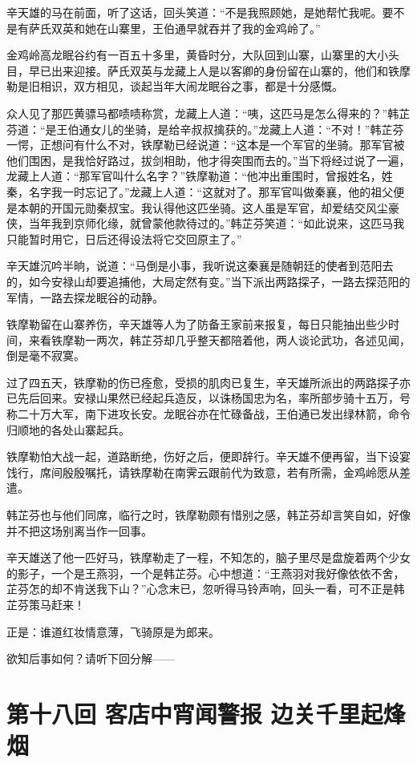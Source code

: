 \documentclass[12pt,oneside]{book}
\begin{document}
辛天雄的马在前面，听了这话，回头笑道：``不是我照顾她，是她帮忙我呢。要不是有萨氏双英和她在山寨里，王伯通早就吞并了我的金鸡岭了。''

金鸡岭高龙眠谷约有一百五十多里，黄昏时分，大队回到山寨，山寨里的大小头目，早已出来迎接。萨氏双英与龙藏上人是以客卿的身份留在山寨的，他们和铁摩勒是旧相识，双方相见，谈起当年大闹龙眠谷之事，都是十分感慨。

众人见了那匹黄骠马都啧啧称赏，龙藏上人道：``咦，这匹马是怎么得来的？''韩芷芬道：``是王伯通女儿的坐骑，是给辛叔叔擒获的。''龙藏上人道：``不对！''韩芷芬一愕，正想问有什么不对，铁摩勒已经说道：``这本是一个军官的坐骑。那军官被他们围困，是我恰好路过，拔剑相助，他才得突围而去的。''当下将经过说了一遍，龙藏上人道：``那军官叫什么名字？''铁摩勒道：``他冲出重围时，曾报姓名，姓秦，名字我一时忘记了。''龙藏上人道：``这就对了。那军官叫做秦襄，他的祖父便是本朝的开国元勋秦叔宝。我认得他这匹坐骑。这人虽是军官，却爱结交风尘豪侠，当年我到京师化缘，就曾蒙他款待过的。''韩芷芬笑道：``如此说来，这匹马我只能暂时用它，日后还得设法将它交回原主了。''

辛天雄沉吟半晌，说道：``马倒是小事，我听说这秦襄是随朝廷的使者到范阳去的，如今安禄山却要追捕他，大局定然有变。''当下派出两路探子，一路去探范阳的军情，一路去探龙眠谷的动静。

铁摩勒留在山寨养伤，辛天雄等人为了防备王家前来报复，每日只能抽出些少时间，来看铁摩勒一两次，韩芷芬却几乎整天都陪着他，两人谈论武功，各述见闻，倒是毫不寂寞。

过了四五天，铁摩勒的伤已痊愈，受损的肌肉已复生，辛天雄所派出的两路探子亦已先后回来。安禄山果然已经起兵造反，以诛杨国忠为名，率所部步骑十五万，号称二十万大军，南下进攻长安。龙眠谷亦在忙碌备战，王伯通已发出绿林箭，命令归顺地的各处山寨起兵。

铁摩勒怕大战一起，道路断绝，伤好之后，便即辞行。辛天雄不便再留，当下设宴饯行，席间殷殷嘱托，请铁摩勒在南霁云跟前代为致意，若有所需，金鸡岭愿从差遣。

韩芷芬也与他们同席，临行之时，铁摩勒颇有惜别之感，韩芷芬却言笑自如，好像并不把这场别离当作一回事。

辛天雄送了他一匹好马，铁摩勒走了一程，不知怎的，脑子里尽是盘旋着两个少女的影子，一个是王燕羽，一个是韩芷芬。心中想道：``王燕羽对我好像依依不舍，芷芬怎的却不肯送我下山？''心念末已，忽听得马铃声响，回头一看，可不正是韩芷芬策马赶来！

正是：谁道红妆情意薄，飞骑原是为郎来。

欲知后事如何？请听下回分解------

\chapter{第十八回 客店中宵闻警报
边关千里起烽烟}\label{ux7b2cux5341ux516bux56de-ux5ba2ux5e97ux4e2dux5bb5ux95fbux8b66ux62a5-ux8fb9ux5173ux5343ux91ccux8d77ux70fdux70df}
\end{document}
